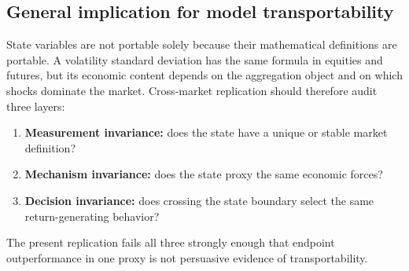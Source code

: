 \subsection{General implication for model transportability}

State variables are not portable solely because their mathematical definitions are
portable. A volatility standard deviation has the same formula in equities and futures,
but its economic content depends on the aggregation object and on which shocks dominate
the market. Cross-market replication should therefore audit three layers:

\begin{enumerate}
  \item \textbf{Measurement invariance:} does the state have a unique or stable market
  definition?
  \item \textbf{Mechanism invariance:} does the state proxy the same economic forces?
  \item \textbf{Decision invariance:} does crossing the state boundary select the same
  return-generating behavior?
\end{enumerate}

The present replication fails all three strongly enough that endpoint outperformance in
one proxy is not persuasive evidence of transportability.
